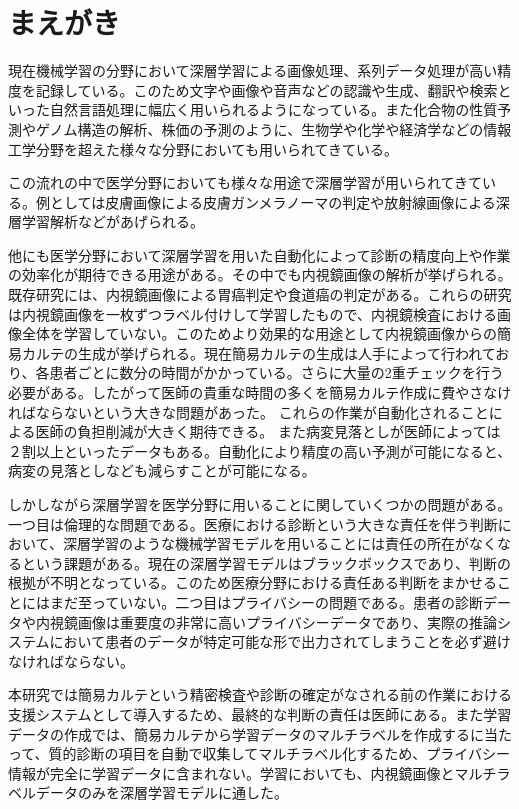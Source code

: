 \section{まえがき}
現在機械学習の分野において深層学習による画像処理\cite{CNN,ResNet}、系列データ処理\cite{RNN,LSTM,Transformer}が高い精度を記録している。このため文字や画像や音声などの認識や生成\cite{DL_LVCSR,ImageNet,GAN,VAE}、翻訳や検索といった自然言語処理\cite{Transformer,Seq2Seq,effective_attention}に幅広く用いられるようになっている。また化合物の性質予測\cite{Chemistry}やゲノム構造の解析\cite{Genomics}、株価の予測\cite{stock_prediction}のように、生物学や化学や経済学などの情報工学分野を超えた様々な分野においても用いられてきている。

この流れの中で医学分野においても様々な用途で深層学習が用いられてきている。例としては皮膚画像による皮膚ガンメラノーマの判定\cite{skin_cancer_melanoma}や放射線画像による深層学習解析\cite{radiology}などがあげられる。

他にも医学分野において深層学習を用いた自動化によって診断の精度向上や作業の効率化が期待できる用途がある。その中でも内視鏡画像の解析が挙げられる。既存研究には、内視鏡画像による胃癌判定\cite{stomach_cancer}や食道癌\cite{esophageal_cancer}の判定がある。これらの研究は内視鏡画像を一枚ずつラベル付けして学習したもので、内視鏡検査における画像全体を学習していない。このためより効果的な用途として内視鏡画像からの簡易カルテの生成が挙げられる。現在簡易カルテの生成は人手によって行われており、各患者ごとに数分の時間がかかっている。さらに大量の2重チェックを行う必要がある。したがって医師の貴重な時間の多くを簡易カルテ作成に費やさなければならないという大きな問題があった。
これらの作業が自動化されることによる医師の負担削減が大きく期待できる。
また病変見落としが医師によっては２割以上といったデータ\cite{medical_problem2}もある。自動化により精度の高い予測が可能になると、病変の見落としなども減らすことが可能になる。

しかしながら深層学習を医学分野に用いることに関していくつかの問題がある。一つ目は倫理的な問題である。医療における診断という大きな責任を伴う判断において、深層学習のような機械学習モデルを用いることには責任の所在がなくなるという課題がある。現在の深層学習モデルはブラックボックスであり、判断の根拠が不明となっている。このため医療分野における責任ある判断をまかせることにはまだ至っていない。二つ目はプライバシーの問題である。患者の診断データや内視鏡画像は重要度の非常に高いプライバシーデータであり、実際の推論システムにおいて患者のデータが特定可能な形で出力されてしまうことを必ず避けなければならない。

本研究では簡易カルテという精密検査や診断の確定がなされる前の作業における支援システムとして導入するため、最終的な判断の責任は医師にある。また学習データの作成では、簡易カルテから学習データのマルチラベルを作成するに当たって、質的診断の項目を自動で収集してマルチラベル化するため、プライバシー情報が完全に学習データに含まれない。学習においても、内視鏡画像とマルチラベルデータのみを深層学習モデルに通した。

